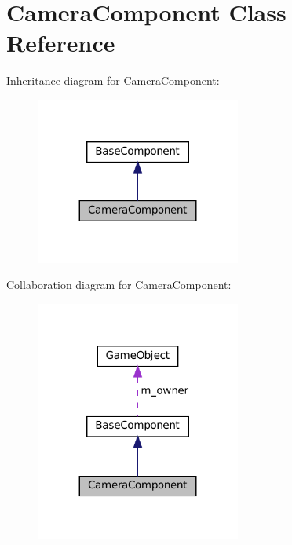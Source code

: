 \hypertarget{classCameraComponent}{}\section{Camera\+Component Class Reference}
\label{classCameraComponent}


Inheritance diagram for Camera\+Component\+:
\nopagebreak
\begin{figure}[H]
\begin{center}
\leavevmode
\includegraphics[width=191pt]{classCameraComponent__inherit__graph}
\end{center}
\end{figure}


Collaboration diagram for Camera\+Component\+:
\nopagebreak
\begin{figure}[H]
\begin{center}
\leavevmode
\includegraphics[width=191pt]{classCameraComponent__coll__graph}
\end{center}
\end{figure}
